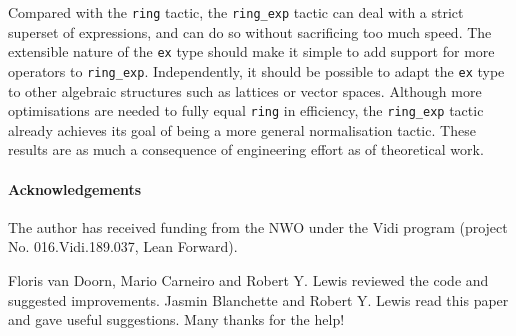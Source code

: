\documentclass{llncs}
\newcommand{\lean}[1]{\texttt{#1}\xspace} %
\newcommand{\ex}{\lean{ex}}
\newcommand{\ring}{\lean{ring}}
\newcommand{\ringexp}{\lean{ring\_exp}}
\begin{document}
Compared with the \ring tactic, the \ringexp tactic can deal with a strict superset of expressions,
and can do so without sacrificing too much speed.
The extensible nature of the \ex type should make it simple to add support for more operators to \ringexp.
Independently, it should be possible to adapt the \ex type to other algebraic structures
such as lattices or vector spaces.
Although more optimisations are needed to fully equal \ring in efficiency,
the \ringexp tactic already achieves its goal of being a more general normalisation tactic.
These results are as much a consequence of engineering effort as of theoretical work.


\paragraph{Acknowledgements}
The author has received funding from the NWO under the Vidi program (project
No. 016.Vidi.189.037, Lean Forward).

Floris van Doorn, Mario Carneiro and Robert Y. Lewis reviewed the code and
suggested improvements.
Jasmin Blanchette and Robert Y. Lewis read this paper and gave useful suggestions.
Many thanks for the help!

\printbibliography
\end{document}
